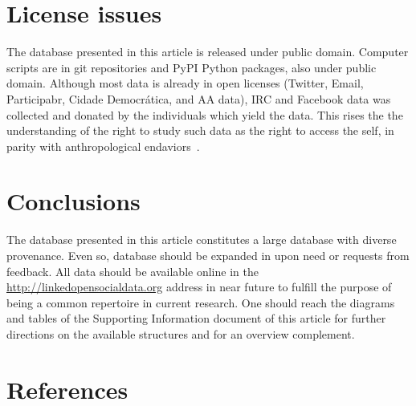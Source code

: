 \documentclass[review]{elsarticle}
\begin{document}
\section{License issues}
The database presented in this article is released under public domain.
Computer scripts are in git repositories and PyPI Python packages, also under public domain.
Although most data is already in open licenses (Twitter, Email, Participabr, Cidade Democrática, and AA data), IRC and Facebook data was collected
and donated by the individuals which yield the data.
This rises the the understanding of the right to study such data as the right to access the self,
in parity with anthropological endaviors~\cite{antphy,antphy2}.
\section{Conclusions}
\label{conclusions}
The database presented in this article
constitutes a large database with diverse provenance.
Even so, database should be expanded in upon need or requests from feedback.
All data should be available online in the \url{http://linkedopensocialdata.org}
address in near future to fulfill the purpose of being a common
repertoire in current research.
One should reach the diagrams and tables of the 
Supporting Information document of this article
for further directions
on the available structures and for an overview complement.

\section*{References}
%
% 

%
%
\end{document}

